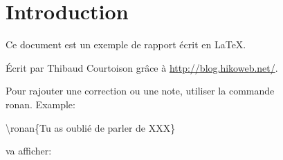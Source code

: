 \section*{Introduction} %

Ce document est un exemple de rapport écrit en \LaTeX.

Écrit par Thibaud Courtoison grâce à \url{http://blog.hikoweb.net/}.

Pour rajouter une correction ou une note, utiliser la commande \\ronan. Example:

\textbackslash{}ronan\{Tu as oublié de parler de XXX\}

va afficher:

